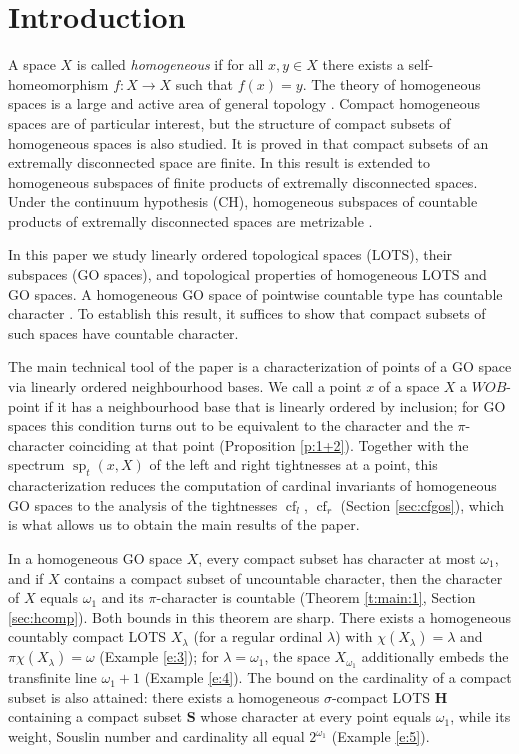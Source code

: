 \documentclass[preprint]{elsarticle}
\def\om{\omega}
\def\la{\lambda}
\def\sp{\operatorname{sp}}
\def\term#1{{\it #1}}
\theoremstyle{definition}
\theoremstyle{remark}
\def\si{\sigma}
\def\cf{\operatorname{cf}}
\def\wob/{$WOB$}
\def\sS{\mathbf{S}}
\def\Hs{\mathbf{H}}
\begin{document}
\section{Introduction} \label{sec:intro}

A space $X$ is called \term{homogeneous} if for all $x,y\in X$ there exists a self-homeomorphism $f: X\to X$ such that $f(x)=y$.
The theory of homogeneous spaces is a large and active area of general topology \cite{Arhangelskii_vanMill}. Compact homogeneous spaces are of particular interest, but the structure of compact subsets of homogeneous spaces is also studied. It is proved in \cite{arh67,Arhangelskii2018,rezn2020} that compact subsets of an extremally disconnected space are finite. In \cite{rezn2020,Groznova2023ru} this result is extended to homogeneous subspaces of finite products of extremally disconnected spaces.
Under the continuum hypothesis ($\mathrm{CH}$), homogeneous subspaces of countable products of extremally disconnected spaces are metrizable \cite{rezn2020}.

In this paper we study linearly ordered topological spaces (LOTS), their subspaces (GO spaces), and topological properties of homogeneous LOTS and GO spaces.
A homogeneous GO space of pointwise countable type has countable character \cite[Corollary 29]{Arhangelskii2005}.
To establish this result, it suffices to show that compact subsets of such spaces have countable character.

The main technical tool of the paper is a characterization of points of a GO space via linearly ordered neighbourhood bases. We call a point $x$ of a space $X$ a \wob/-point if it has a neighbourhood base that is linearly ordered by inclusion; for GO spaces this condition turns out to be equivalent to the character and the $\pi$-character coinciding at that point (Proposition \ref{p:1+2}). Together with the spectrum $\sp_t(x,X)$ of the left and right tightnesses at a point, this characterization reduces the computation of cardinal invariants of homogeneous GO spaces to the analysis of the tightnesses $\cf_l$, $\cf_r$ (Section \ref{sec:cfgos}), which is what allows us to obtain the main results of the paper.

In a homogeneous GO space $X$, every compact subset has character at most $\om_1$, and if $X$ contains a compact subset of uncountable character, then the character of $X$ equals $\om_1$ and its $\pi$-character is countable (Theorem \ref{t:main:1}, Section \ref{sec:hcomp}). Both bounds in this theorem are sharp. There exists a homogeneous countably compact LOTS $X_\la$ (for a regular ordinal $\la$) with $\chi(X_\la)=\la$ and $\pi\chi(X_\la)=\om$ (Example \ref{e:3}); for $\la=\om_1$, the space $X_{\om_1}$ additionally embeds the transfinite line $\om_1+1$ (Example \ref{e:4}). The bound on the cardinality of a compact subset is also attained: there exists a homogeneous $\si$-compact LOTS $\Hs$ containing a compact subset $\sS$ whose character at every point equals $\om_1$, while its weight, Souslin number and cardinality all equal $2^{\om_1}$ (Example \ref{e:5}).
\end{document}
